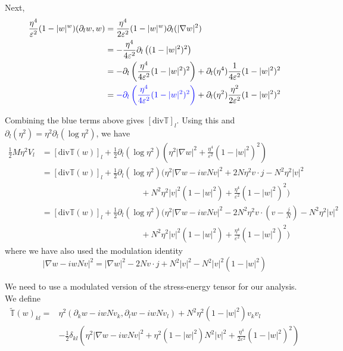\documentclass[a4paper]{article}
\renewcommand{\div}{\mathrm{div}}
\begin{document}
Next,
\begin{align}
  \frac{\eta^4}{\varepsilon^2} (1-|w|^w) (\partial_l w, w) &= \frac{\eta^4}{2 \varepsilon^2 } (1 - |w|^w) \partial_l ( |\nabla w|^2 ) \nonumber \\
  &= - \frac{\eta^4}{4 \varepsilon^2} \partial_l \left( (1-|w|^2)^2 \right) \nonumber \\
  &= - \partial_l \left( \frac{\eta^4}{4 \varepsilon^2} (1-|w|^2)^2 \right) + \partial_l (\eta^4) \frac{1}{4 \varepsilon^2} (1-|w|^2)^2 \nonumber \\
  &= { \color{blue} - \partial_l \left( \frac{\eta^4}{4 \varepsilon^2} (1-|w|^2)^2 \right) } + \partial_l (\eta^2) \frac{\eta^2}{2 \varepsilon^2}
  (1-|w|^2)^2
  \label{eq:V_l_term2}
\end{align}

Combining the blue terms above gives $[\div \mathbb{T}]_l$. Using this and $\partial_l (\eta^2) = \eta^2 \partial_l (\log \eta^2)$, we have
\begin{align}
  \frac{1}{2} M \eta^2 V_l &= [ \div \mathbb{T}(w) ]_l + \frac{1}{2} \partial_l (\log \eta^2) \left( \eta^2 |\nabla w|^2 + \frac{\eta^4}{\varepsilon^2} (
  1-|w|^2)^2 \right) \nonumber \\
  &= [ \div \mathbb{T}(w) ]_l + \frac{1}{2} \partial_l (\log \eta^2) \bigg( \eta^2 | \nabla w - i w N v |^2 + 2 N \eta^2 v \cdot j - N^2 \eta^2 |v|^2
  \nonumber \\
  &\hspace{5cm} + N^2 \eta^2 |v|^2 (1-|w|^2) + \frac{\eta^4}{\varepsilon^2} (1-|w|^2)^2 \bigg) \nonumber \\
  &= [ \div \mathbb{T}(w) ]_l + \frac{1}{2} \partial_l (\log \eta^2) \bigg( \eta^2 |\nabla w - i w N v|^2 - 2N^2 \eta^2 v \cdot \left( v -
  \frac{j}{N} \right) - N^2 \eta^2 |v|^2 \nonumber \\
  &\hspace{5cm} + N^2 \eta^2 |v|^2 (1-|w|^2) + \frac{\eta^4}{\varepsilon^2} (1-|w|^2)^2 \bigg)
  \label{eq:V_l-final}
\end{align}
where we have also used the modulation identity
\begin{equation}
  | \nabla w - i w N v |^2 = |\nabla w|^2 - 2N v \cdot j + N^2 |v|^2 - N^2 |v|^2 (1-|w|^2)
  \label{eq:mod_identity}
\end{equation}

We need to use a modulated version of the stress-energy tensor for our analysis. We define
\begin{align}
  \tilde{\mathbb{T}}(w)_{kl} = &\eta^2 (\partial_k w - i w N v_k, \partial_l w - i w N v_l) + N^2 \eta^2 (1-|w|^2)v_k v_l \nonumber \\
  &- \frac{1}{2} \delta_{kl} \left( \eta^2 |\nabla w - i w N v|^2 + \eta^2 (1-|w|^2)N^2|v|^2 + \frac{\eta^4}{2 \varepsilon^2} (1-|w|^2)^2 \right)
  \label{def:mod_stress-energy}
\end{align}
\end{document}
